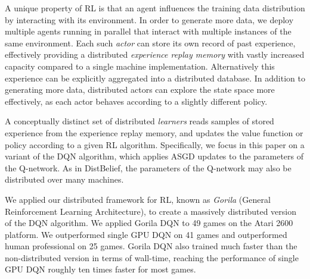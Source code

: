 A unique property of RL is that an agent influences the training data distribution by interacting with its environment. In order to generate more data, we deploy multiple agents running in parallel that interact with multiple instances of the same environment. Each such \emph{actor} can store its own record of past experience, effectively providing a distributed \emph{experience replay memory} with vastly increased capacity compared to a single machine implementation. Alternatively this experience can be explicitly aggregated into a distributed database. In addition to generating more data, distributed actors can explore the state space more effectively, as each actor behaves according to a slightly different policy. 

A conceptually distinct set of distributed \emph{learners} reads samples of stored experience from the experience replay memory, and updates the value function or policy according to a given RL algorithm. Specifically, we focus in this paper on a variant of the DQN algorithm, which applies ASGD updates to the parameters of the Q-network. As in DistBelief, the parameters of the Q-network may also be distributed over many machines.

We applied our distributed framework for RL, known as \emph{Gorila} (General Reinforcement Learning Architecture), to create a massively distributed version of the DQN algorithm. We applied Gorila DQN to 49 games on the Atari 2600 platform. We outperformed single GPU DQN on 41 games and outperformed human professional on 25 games. Gorila DQN also trained much faster than the non-distributed version in terms of wall-time, reaching the performance of single GPU DQN roughly ten times faster for most games.


